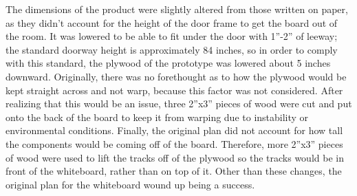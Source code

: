 The dimensions of the product were slightly altered from those written on paper, as they didn't account for the height of the door frame to get the board out of the room. It was lowered to be able to fit under the door with 1''-2'' of leeway; the standard doorway height is approximately 84 inches, so in order to comply with this standard, the plywood of the prototype was lowered about 5 inches downward.
Originally, there was no forethought as to how the plywood would be kept straight across and not warp, because this factor was not considered. After realizing that this would be an issue, three 2''x3'' pieces of wood were cut and put onto the back of the board to keep it from warping due to instability or environmental conditions.
Finally, the original plan did not account for how tall the components would be coming off of the board. Therefore, more 2''x3'' pieces of wood were used to lift the tracks off of the plywood so the tracks would be in front of the whiteboard, rather than on top of it. Other than these changes, the original plan for the whiteboard wound up being a success.


